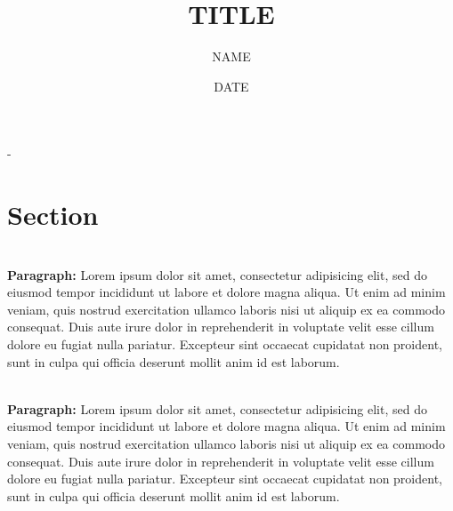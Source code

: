 \documentclass[a4paper, 11pt]{article}
\title{TITLE}
\author{NAME}
\date{DATE}
\renewcommand\maketitle[0]{
\begin{center}
	\fontsize{20pt}{20pt}\selectfont
	\textbf{\thetitle}
\end{center}
\begin{center}
	\vspace{1.25em}
	\fontsize{10pt}{10pt}\selectfont
	\theauthor \hspace{0.5cm} - \hspace{0.5cm} \thedate
\end{center}

\fontsize{11pt}{11pt}\selectfont
\vspace{2em}
}
\renewcommand{\paragraph}[1]{\mbox{}\\ \textbf{#1:} \hspace{0.15em}}
\begin{document}

    \linespread{1.25}
	\graphicspath{ {./img/} }



    \maketitle



	\section{Section}

	\paragraph{Paragraph} Lorem ipsum dolor sit amet, consectetur adipisicing elit, sed do eiusmod tempor incididunt ut labore et dolore magna aliqua. Ut enim ad minim veniam, quis nostrud exercitation ullamco laboris nisi ut aliquip ex ea commodo consequat. Duis aute irure dolor in reprehenderit in voluptate velit esse cillum dolore eu fugiat nulla pariatur. Excepteur sint occaecat cupidatat non proident, sunt in culpa qui officia deserunt mollit anim id est laborum.

	\paragraph{Paragraph} Lorem ipsum dolor sit amet, consectetur adipisicing elit, sed do eiusmod tempor incididunt ut labore et dolore magna aliqua. Ut enim ad minim veniam, quis nostrud exercitation ullamco laboris nisi ut aliquip ex ea commodo consequat. Duis aute irure dolor in reprehenderit in voluptate velit esse cillum dolore eu fugiat nulla pariatur. Excepteur sint occaecat cupidatat non proident, sunt in culpa qui officia deserunt mollit anim id est laborum.
\end{document}
